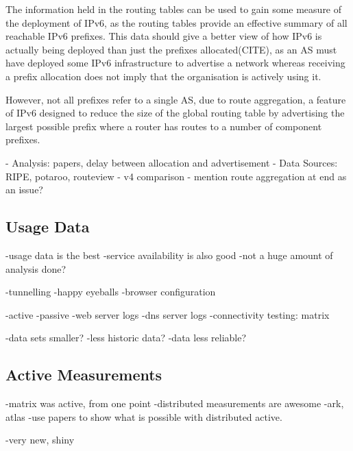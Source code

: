 The information held in the routing tables can be used to gain some measure of
the deployment of IPv6, as the routing tables provide an effective summary of
all reachable IPv6 prefixes. This data should give a better view of how IPv6 is
actually being deployed than just the prefixes allocated(CITE), as an AS must
have deployed some IPv6 infrastructure to advertise a network whereas receiving
a prefix allocation does not imply that the organisation is actively using it.








However, not all prefixes refer to a single AS,
due to route aggregation, a feature of IPv6 designed to reduce the size of the
global routing table by advertising the largest possible prefix where a router
has routes to a number of component prefixes.



- Analysis: papers, delay between allocation and advertisement
- Data Sources: RIPE, potaroo, routeview
- v4 comparison
- mention route aggregation at end as an issue?

\subsection{Usage Data}

-usage data is the best
-service availability is also good
-not a huge amount of analysis done?

-tunnelling
-happy eyeballs
-browser configuration

-active
-passive
-web server logs
-dns server logs
-connectivity testing: matrix

-data sets smaller?
-less historic data?
-data less reliable?

\subsection{Active Measurements}

-matrix was active, from one point
-distributed measurements are awesome
-ark, atlas
-use papers to show what is possible with distributed active.

-very new, shiny

